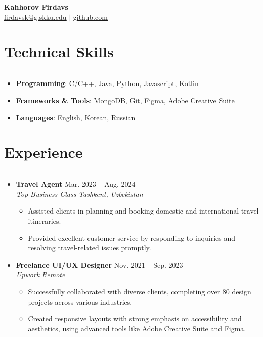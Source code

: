 \documentclass[letterpaper, 10pt]{article}
\begin{document}
\begin{center}
\textbf{\LARGE Kahhorov Firdavs} \\ \vspace{2pt}
\href{mailto:firdavsk@g.skku.edu}{\underline{firdavsk@g.skku.edu}} $|$
\href{https://github.com/firdavskahhorov}{\underline{github.com}}
\end{center}
\section*{Technical Skills}
\hrule
\vspace{4pt}
\begin{itemize}
\item[] \textbf{Programming}: C/C++, Java, Python, Javascript, Kotlin %
\item[] \textbf{Frameworks \& Tools}: MongoDB, Git, Figma, Adobe Creative Suite  %
\item[] \textbf{Languages}: English, Korean, Russian %
\end{itemize}
\section*{Experience}
\hrule
\vspace{4pt}
\begin{itemize}
\item[]
\textbf{Travel Agent} \hfill Mar. 2023 -- Aug. 2024 \\ %
\textit{Top Business Class} \hfill \textit{Tashkent, Uzbekistan}
\begin{itemize}
\item Assisted clients in planning and booking domestic and international travel itineraries.
\item Provided excellent customer service by responding to inquiries and resolving travel-related issues promptly.
\end{itemize}
\item[]
\textbf{Freelance UI/UX Designer} \hfill Nov. 2021 -- Sep. 2023 \\ %
\textit{Upwork} \hfill \textit{Remote}
\begin{itemize}
\item Successfully collaborated with diverse clients, completing over 80 design projects across various industries.
\item Created responsive layouts with strong emphasis on accessibility and aesthetics, using advanced tools like Adobe Creative Suite and Figma.
\end{itemize}
\end{itemize}
\end{document}
